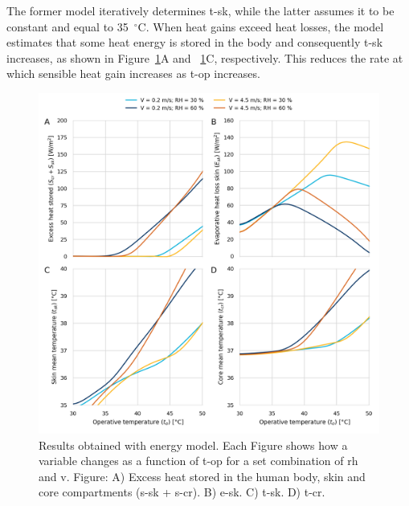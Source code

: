 The former model iteratively determines \ac{t-sk}, while the latter assumes it to be constant and equal to 35~$^{\circ}$C\@.
When heat gains exceed heat losses, the  model estimates that some heat energy is stored in the body and consequently \ac{t-sk} increases, as shown in Figure~\ref{fig:results_model_2}A and ~\ref{fig:results_model_2}C, respectively.
This reduces the rate at which sensible heat gain increases as \ac{t-op} increases.

\begin{figure}[thb!]
    \centering
    \includegraphics[width=\textwidth]{figures/results_model_2}
    \caption{Results obtained with  energy model.
    Each Figure shows how a variable changes as a function of \ac{t-op} for a set combination of \ac{rh} and \ac{v}.
    Figure: A)  Excess heat stored in the human body, skin and core compartments (\ac{s-sk} + \ac{s-cr}).
    B) \Acf{e-sk}.
    C) \Acf{t-sk}.
    D) \Acf{t-cr}.}
    \label{fig:results_model_2}
\end{figure}

